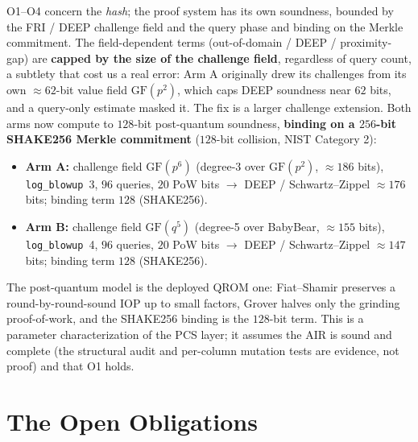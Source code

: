 \documentclass[11pt]{article}
\newcommand{\GF}[1]{\mathrm{GF}(#1)}
\theoremstyle{plain}
\theoremstyle{definition}
\begin{document}
O1--O4 concern the \emph{hash}; the proof system has its own soundness, bounded by the FRI / DEEP
challenge field and the query phase and binding on the Merkle commitment. The field-dependent terms
(out-of-domain / DEEP / proximity-gap) are \textbf{capped by the size of the challenge field},
regardless of query count, a subtlety that cost us a real error: Arm A originally drew its
challenges from its own $\approx 62$-bit value field $\GF{p^2}$, which caps DEEP soundness near $62$
bits, and a query-only estimate masked it. The fix is a larger challenge extension. Both arms now
compute to $128$-bit post-quantum soundness, \textbf{binding on a $256$-bit SHAKE256 Merkle
commitment} ($128$-bit collision, NIST Category 2):
\begin{itemize}[leftmargin=*]
\item \textbf{Arm A:} challenge field $\GF{p^6}$ (degree-3 over $\GF{p^2}$, $\approx 186$ bits),
  \texttt{log\_blowup}~3, $96$ queries, $20$ PoW bits $\to$ DEEP / Schwartz--Zippel $\approx 176$
  bits; binding term $128$ (SHAKE256).
\item \textbf{Arm B:} challenge field $\GF{q^5}$ (degree-5 over BabyBear, $\approx 155$ bits),
  \texttt{log\_blowup}~4, $96$ queries, $20$ PoW bits $\to$ DEEP / Schwartz--Zippel $\approx 147$
  bits; binding term $128$ (SHAKE256).
\end{itemize}
The post-quantum model is the deployed QROM one: Fiat--Shamir preserves a round-by-round-sound IOP up
to small factors, Grover halves only the grinding proof-of-work, and the SHAKE256 binding is the
$128$-bit term. This is a parameter characterization of the PCS layer; it assumes the AIR is sound
and complete (the structural audit and per-column mutation tests are evidence, not proof) and that
O1 holds.

\section{The Open Obligations}
\end{document}
